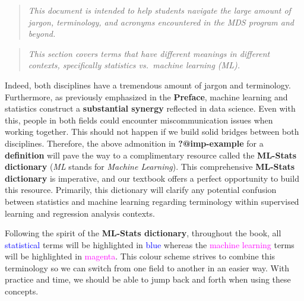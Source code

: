 \documentclass[
  letterpaper,
  DIV=11,
  numbers=noendperiod]{scrreprt}
\newcounter{quartocalloutnteno}
\newcommand{\quartocalloutnte}[1]{\refstepcounter{quartocalloutnteno}\label{#1}}
\begin{document}
\begin{quote}
\emph{This document is intended to help students navigate the large
amount of jargon, terminology, and acronyms encountered in the MDS
program and beyond.}
\end{quote}

\begin{quote}
\emph{This section covers terms that have different meanings in
different contexts, specifically statistics vs.~machine learning (ML).}
\end{quote}

Indeed, both disciplines have a tremendous amount of jargon and
terminology. Furthermore, as previously emphasized in the
\textbf{Preface}, machine learning and statistics construct a
\textbf{substantial synergy} reflected in data science. Even with this,
people in both fields could encounter miscommunication issues when
working together. This should not happen if we build solid bridges
between both disciplines. Therefore, the above admonition in
\textbf{?@imp-example} for a \textbf{definition} will pave the way to a
complimentary resource called the \textbf{ML-Stats dictionary}
(\emph{ML} stands for \emph{Machine Learning}). This comprehensive
\textbf{ML-Stats dictionary} is imperative, and our textbook offers a
perfect opportunity to build this resource. Primarily, this dictionary
will clarify any potential confusion between statistics and machine
learning regarding terminology within supervised learning and regression
analysis contexts.

\begin{tcolorbox}[enhanced jigsaw, bottomrule=.15mm, breakable, colback=white, leftrule=.75mm, coltitle=black, rightrule=.15mm, bottomtitle=1mm, title=\textcolor{quarto-callout-note-color}{\faInfo}\hspace{0.5em}{Note \ref*{nte-term-highlight}: Heads-up on terminology highlights!}, opacitybacktitle=0.6, toprule=.15mm, titlerule=0mm, arc=.35mm, colbacktitle=quarto-callout-note-color!10!white, toptitle=1mm, colframe=quarto-callout-note-color-frame, left=2mm, opacityback=0]

\quartocalloutnte{nte-term-highlight} 

Following the spirit of the \textbf{ML-Stats dictionary}, throughout the
book, all \textcolor{blue}{statistical} terms will be highlighted in
\textcolor{blue}{blue} whereas the \textcolor{magenta}{machine learning}
terms will be highlighted in \textcolor{magenta}{magenta}. This colour
scheme strives to combine this terminology so we can switch from one
field to another in an easier way. With practice and time, we should be
able to jump back and forth when using these concepts.

\end{tcolorbox}
\end{document}
